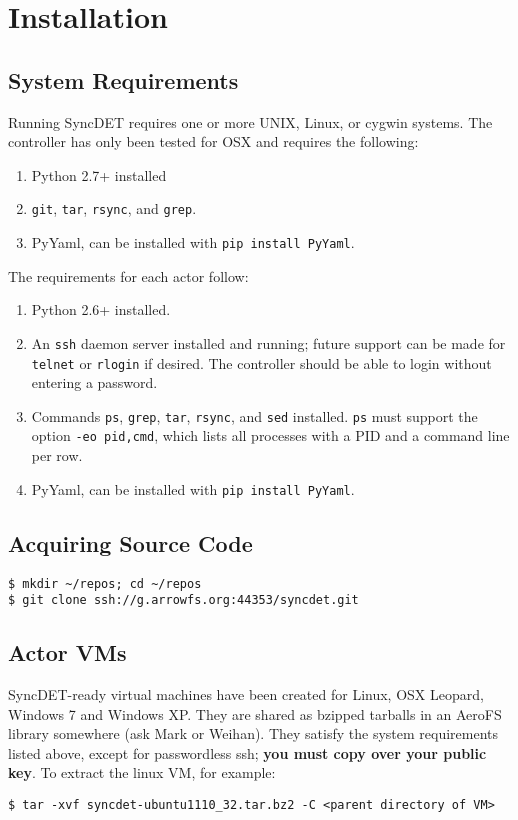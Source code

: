 \section{Installation}

\subsection{System Requirements}

Running SyncDET requires one or more UNIX, Linux, or cygwin systems.
The controller has only been tested for OSX and requires the
following:
\begin{enumerate}
\item Python 2.7+ installed
\item {\tt git}, {\tt tar}, {\tt rsync}, and {\tt grep}.
\item PyYaml, can be installed with {\tt pip install PyYaml}.
\end{enumerate}
The requirements for each actor follow:
\begin{enumerate}
\item Python 2.6+ installed.
\item An {\tt ssh} daemon server installed and running; future support can be
made for {\tt telnet} or {\tt rlogin} if desired. The controller should be able
to login without entering a password.
\item Commands {\tt ps}, {\tt grep}, {\tt tar}, {\tt rsync}, and {\tt sed}
installed. {\tt ps} must support the option {\tt -eo pid,cmd}, which lists all
processes with a PID and a command line per row.
\item PyYaml, can be installed with {\tt pip install PyYaml}.
\end{enumerate}

\subsection{Acquiring Source Code}
\begin{verbatim}
$ mkdir ~/repos; cd ~/repos
$ git clone ssh://g.arrowfs.org:44353/syncdet.git
\end{verbatim}

\subsection{Actor VMs}
SyncDET-ready virtual machines have been created for Linux, OSX Leopard, Windows
7 and Windows XP. They are shared as bzipped tarballs in an AeroFS library
somewhere (ask Mark or Weihan). They satisfy the system requirements listed
above, except for passwordless ssh; {\bf you must copy over your public key}. To
extract the linux VM, for example:
\begin{verbatim}
$ tar -xvf syncdet-ubuntu1110_32.tar.bz2 -C <parent directory of VM>
\end{verbatim}

